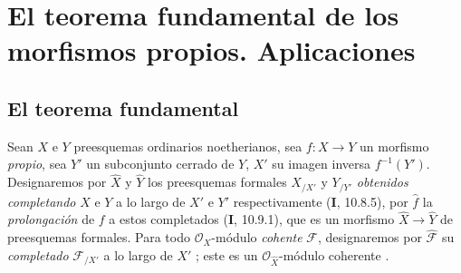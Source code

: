 \section{El teorema fundamental de los morfismos propios. Aplicaciones}
\label{section:III.4}
\label{section:III.4-fr}


\subsection{El teorema fundamental}
\label{subsection:III.4.1}
\label{subsection:III.4.1-fr}

\begin{env}[4.1.1]
\label{III.4.1.1}
\label{III.4.1.1-fr}
Sean $X$ e $Y$ preesquemas ordinarios noetherianos, sea $f:X\to Y$ un
morfismo \emph{propio}, sea $Y'$ un subconjunto cerrado de $Y$, $X'$ su imagen inversa
$f^{-1}(Y')$. Designaremos por $\widehat X$ y $\widehat Y$ los preesquemas formales
$X_{/X'}$ y $Y_{/Y'}$ \emph{obtenidos completando} $X$ e $Y$ a lo largo de
$X'$ e $Y'$ respectivamente (\textbf{I}, 10.8.5), por $\widehat f$ la \emph{prolongación}
de $f$ a estos completados (\textbf{I}, 10.9.1), que es un morfismo
$\widehat X\to\widehat Y$ de preesquemas formales. Para todo
$\mathcal O_X$-módulo \emph{cohente} $\mathcal F$,
designaremos por $\widehat{\mathcal F}$ su \emph{completado} $\mathcal F_{/X'}$ a lo
largo de $X'$ ; este es un
$\mathcal O_{\widehat X}$-módulo coherente .
\end{env}

